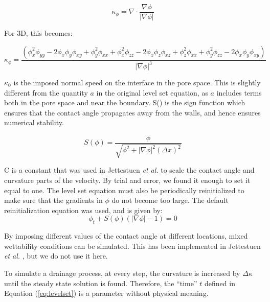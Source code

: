 \begin{equation}
\kappa_\phi = \nabla\cdot\frac{\nabla\phi}{|\nabla\phi|}
\end{equation}  

For 3D, this becomes:

\begin{equation}
\kappa_\phi = \frac{( \phi_x^2\phi_{yy} - 2 \phi_x\phi_y\phi_{xy} + \phi_y^2\phi_{xx}+ \phi_x^2\phi_{zz} - 2 \phi_x\phi_z\phi_{xz} + \phi_z^2\phi_{xx}+ \phi_y^2\phi_{zz} - 2 \phi_x\phi_y\phi_{xy})}{|\nabla\phi|^3}
\label{eq:curvature}
\end{equation}

$\kappa_0$ is the imposed normal speed on the interface in the pore space. This is slightly different from the quantity $a$ in the original level set equation, as $a$ includes terms both in the pore space and near the boundary. S() is the sign function which ensures that the contact angle propagates away from the walls, and hence ensures numerical stability.

\begin{equation}
S(\phi) = \frac{\phi}{\sqrt{\phi^2+|\nabla\phi|^2(\Delta x)^2}}
\end{equation}

C is a constant that was used in Jettestuen \emph{et al.} \cite{jettestuen_level_2013} to scale the contact angle and curvature parts of the velocity. By trial and error, we found it enough to set it equal to one. The level set equation must also be periodically reinitialized to make sure that the gradients in $\phi$ do not become too large. The default reinitialization equation was used, and is given by:
\begin{equation}
\phi_t + S(\phi)(|\nabla\phi|-1) = 0
\end{equation}

By imposing different values of the contact angle at different locations, mixed wettability conditions can be simulated. This has been implemented in Jettestuen \emph{et al.} \cite{jettestuen_level_2013}, but we do not use it here. 

To simulate a drainage process, at every step, the curvature is increased by $\Delta\kappa$ until the steady state solution is found. Therefore, the ``time'' $t$ defined in Equation (\ref{eq:levelset}) is a parameter without physical meaning.

